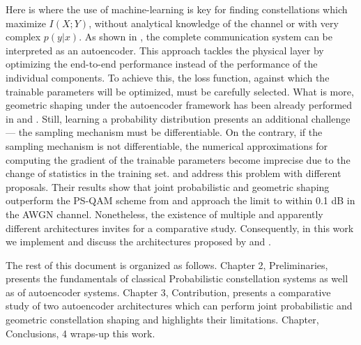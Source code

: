 Here is where the use of machine-learning is key for finding constellations which maximize $I(X;Y)$, without analytical knowledge of the channel or with very complex $p(y|x)$. As shown in \cite{O'Shea}, the complete communication system can be interpreted as an autoencoder. This approach tackles the physical layer by optimizing the end-to-end performance instead of the performance of the individual components. To achieve this, the loss function, against which the trainable parameters will be optimized, must be carefully selected. What is more, geometric shaping under the autoencoder framework has been already performed in \cite{O'Shea} and \cite{Jones}. Still, learning a probability distribution presents an additional challenge --- the sampling mechanism must be differentiable. On the contrary, if the sampling mechanism is not differentiable, the numerical approximations for computing the gradient of the trainable parameters become imprecise due to the change of statistics in the training set. \cite{Stark} and \cite{Aref} address this problem with different proposals. Their results show that joint probabilistic and geometric shaping outperform the PS-QAM scheme from \cite{Boecherer} and approach the limit to within 0.1 dB in the AWGN channel. Nonetheless, the existence of multiple and apparently different architectures invites for a comparative study. Consequently, in this work we implement and discuss the architectures proposed by \cite{Stark} and \cite{Aref}.

The rest of this document is organized as follows. Chapter 2, Preliminaries, presents the fundamentals of classical Probabilistic constellation systems as well as of autoencoder systems. Chapter 3, Contribution, presents a comparative study of two autoencoder architectures which can perform joint probabilistic and geometric constellation shaping and highlights their limitations. Chapter, Conclusions, 4 wraps-up this work.
